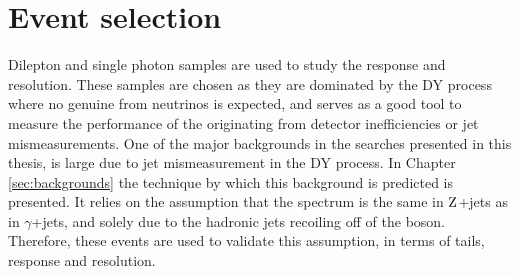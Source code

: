 \section{Event selection}\label{sec:simulation_selection}
\noindent\justify
Dilepton and single photon samples are used to study the \ptmiss response and resolution. 
These samples are chosen as they are dominated by the DY process where no genuine \ptmiss from neutrinos is expected, and serves as a good tool to measure the performance of the \ptmiss originating from detector inefficiencies or jet mismeasurements.  
One of the major backgrounds in the searches presented in this thesis, is large \ptmiss due to jet mismeasurement in the DY process. 
In Chapter \ref{sec:backgrounds} the technique by which this background is predicted is presented. 
It relies on the assumption that the \ptmiss spectrum is the same in $\mathrm{Z}$+jets as in $\gamma$+jets, and solely due to the hadronic jets recoiling off of the boson. 
Therefore, these events are used to validate this assumption, in terms of \ptmiss tails, response and resolution.  
